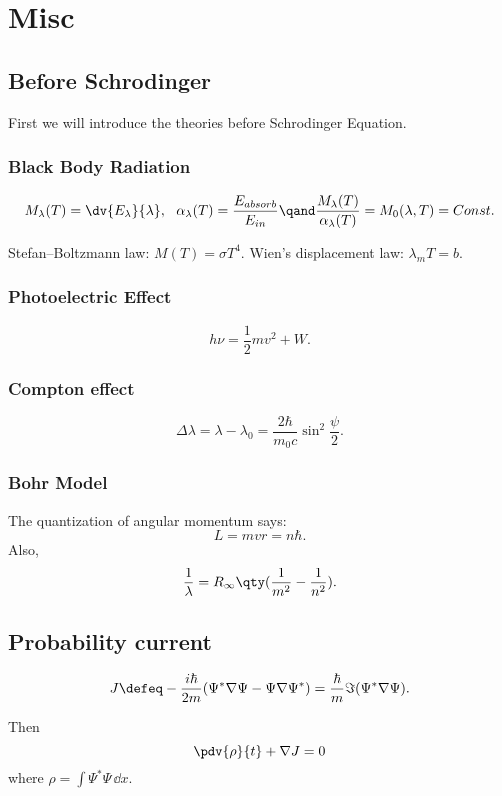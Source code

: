 \section{Misc}
\subsection{Before Schrodinger}
First we will introduce the theories before Schrodinger Equation.
\subsubsection{Black Body Radiation}
\[
	M_\lambda(T)=\dv{E_\lambda}{\lambda},\ \ 
	\alpha_\lambda(T)=\frac{E_{\-{absorb}}}{E_{\-{in}}} \qand
	\frac{M_\lambda(T)}{\alpha_\lambda(T)}=M_0(\lambda,T)=\-{Const}
.\] 
\begin{law}
	Stefan–Boltzmann law: $M(T)=\sigma T^4$. Wien's displacement law: $\lambda_mT=b$.	
\end{law}

\subsubsection{Photoelectric Effect}
\[
    h\nu=\frac{1}{2}mv^2+W
.\] 
\subsubsection{Compton effect}
\[
    \Delta\lambda=\lambda-\lambda_0=\frac{2\hbar}{m_0c}\sin^2\frac{\psi}{2}
.\] 

\subsubsection{Bohr Model}
The quantization of angular momentum says:
\[
    L=mvr=n\hbar
.\] 
Also,
\[
	\frac{1}{\lambda}=R_{\infty}\qty(\frac{1}{m^2}-\frac{1}{n^2})
.\]
\subsection{Probability current}

\begin{defi}
	\[
	    J
		\defeq
		-\frac{i\hbar}{2m}(\Psi^*\nabla\Psi-\Psi\nabla\Psi^*)
		=
		\frac{\hbar}{m}\Im(\Psi^*\nabla\Psi)
	.\] 
\end{defi}

Then 
\[
	\pdv{\rho}{t}+\nabla J = 0
\] 
where $\displaystyle \rho=\int\Psi^*\Psi\,\dd{x}$.

